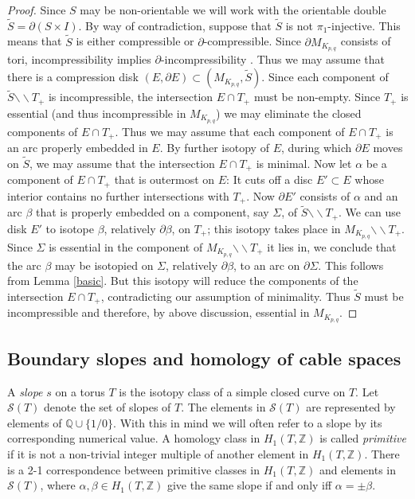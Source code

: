 \documentclass[11pt]{amsart}
\theoremstyle{definition}
\newcommand{\ZZ}{{\mathbb{Z}}}
\newcommand{\QQ}{{\mathbb{Q}}}
\newcommand{\M}{M_{K_{p,q}}}
\newcommand{\cut}{{\backslash \backslash}}
\begin{document}
\begin{proof} Since $S$ may be non-orientable we will work with the orientable double
$\widetilde {S}= \partial (S \times I)$.  By way of contradiction, suppose that  
$\widetilde {S}$  is not $\pi_1$-injective. This means that $\widetilde {S}$  is either compressible or
$\partial$-compressible. Since $\partial \M$ consists of tori, incompressibility implies $\partial$-incompressibility
\cite{Ha}. Thus we may assume that there is a compression disk $(E, \partial E)\subset (\M, \widetilde {S})$. Since each component of $\widetilde {S}\cut T_{+}$ is incompressible, the intersection $E\cap T_{+}$
must be non-empty. Since $T_{+}$ is essential (and thus incompressible in $\M$) we may eliminate the closed components of $E\cap T_{+}$. Thus we may assume that each component of $E\cap T_{+}$
is an arc properly embedded in $E$. By further isotopy of $E$, during which $\partial E$  moves on
$\widetilde {S}$, we may assume that the intersection $E\cap T_{+}$ is minimal. Now let $\alpha$ be a component
of $E\cap T_{+}$ that is outermost on $E$: It cuts off a disc $E'\subset E$ whose interior contains no further intersections 
with $T_{+}$. Now $\partial E'$ consists of $\alpha$ and an arc $\beta$ that is properly embedded on a component,
say $\Sigma$,
of $\widetilde {S}\cut T_{+}$.  We can use  disk $E'$ to isotope  $\beta$, relatively $\partial \beta$,
on $T_{+}$; this isotopy takes place in  $\M \cut T_{+}$.
Since $\Sigma$ is essential in the component of $\M \cut T_{+}$ 
it lies in, we conclude that the arc $\beta$ may be isotopied on $\Sigma$, relatively $\partial \beta$,
to an arc on $\partial \Sigma$.  This follows from Lemma \ref{basic}. But this isotopy will reduce the components of the intersection  $E\cap T_{+}$, contradicting our assumption of minimality. Thus  $\widetilde {S}$
must be incompressible and therefore, by above discussion,  essential  in $\M$.
\end{proof}


\subsection{Boundary slopes and homology of cable spaces} A \emph{slope}  $s$ on  a torus $T$ is the isotopy class of a simple closed curve on $T$.
Let $\mathcal {S}(T)$ denote the set of {slopes}  of $T$.
The elements in  $\mathcal {S}(T)$  are represented by elements of
${\QQ}\cup \{ 1/0\}$.  With this in mind we will often refer to a slope by its corresponding numerical value.
A homology class in
$H_1(T,  \ZZ)$ is called \emph{primitive} if it is not a non-trivial integer multiple of another element in $H_1(T,  \ZZ)$.
There is a 2-1 correspondence between primitive  classes in $H_1(T,  \ZZ)$
and elements  in $\mathcal {S}(T)$, where $\alpha, \beta \in H_1(T,  \ZZ)$ give the same slope if and only iff $\alpha=
\pm \beta$.
\end{document}
